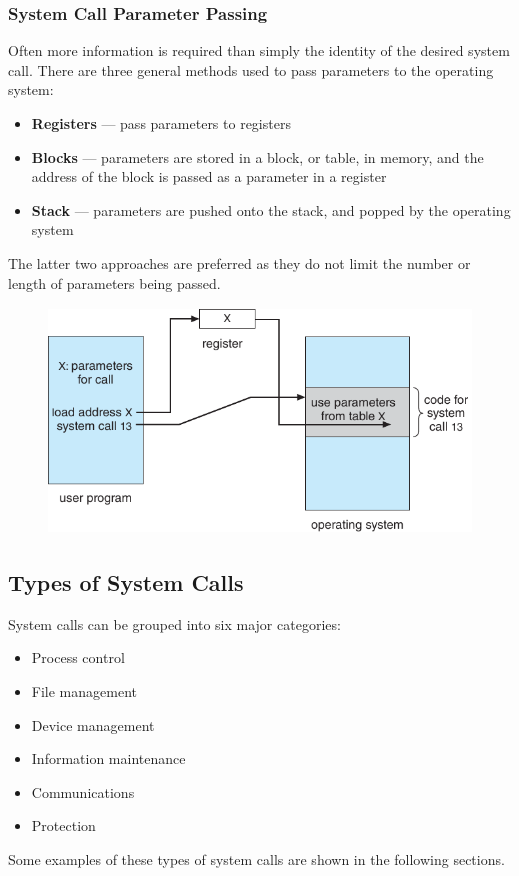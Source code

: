 \documentclass{article}
\begin{document}
\subsubsection{System Call Parameter Passing}
Often more information is required than simply the identity of the
desired system call. There are three general methods used to pass
parameters to the operating system:
\begin{itemize}
    \item \textbf{Registers} --- pass parameters to registers
    \item \textbf{Blocks} --- parameters are stored in a block, or
          table, in memory, and the address of the block is passed as a
          parameter in a register
    \item \textbf{Stack} --- parameters are pushed onto the stack, and
          popped by the operating system
\end{itemize}
The latter two approaches are preferred as they do not limit the number
or length of parameters being passed.
\begin{figure}[H]
    \centering
    \includegraphics[height = 6cm]{figures/system_call_param_pass.pdf}
\end{figure}
\subsection{Types of System Calls}
System calls can be grouped into six major categories:
\begin{itemize}
    \item Process control
    \item File management
    \item Device management
    \item Information maintenance
    \item Communications
    \item Protection
\end{itemize}
Some examples of these types of system calls are shown
in the following sections.
\end{document}
